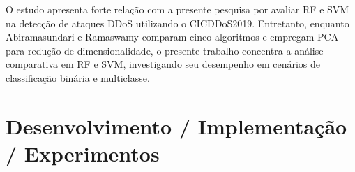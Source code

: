 \documentclass[
    12pt,                %
    openright,           %
    oneside,             %
    a4paper,             %
    english,             %
    brazil               %
]{abntex2}
\makeatletter
\renewcommand{\ABNTEXfontereduzida}{\fontsize{10}{12}\selectfont}
\renewcommand{\legend}[1]{%
  \M@gettitle{#1}%
  \memlegendinfo{#1}%
  \par
  \begingroup
    \@parboxrestore
    \if@minipage
      \@setminipage
    \fi
    \ABNTEXfontereduzida
    \captiondelim{\mbox{}}%
    \@makecaption{}{\ignorespaces #1}\par
  \endgroup}
\makeatother
\begin{document}
O estudo apresenta forte relação com a presente pesquisa por avaliar RF e SVM na detecção de ataques DDoS utilizando o CICDDoS2019. Entretanto, enquanto Abiramasundari e Ramaswamy \cite{abiramasundari2025} comparam cinco algoritmos e empregam PCA para redução de dimensionalidade, o presente trabalho concentra a análise comparativa em RF e SVM, investigando seu desempenho em cenários de classificação binária e multiclasse.

\chapter{Desenvolvimento / Implementação / Experimentos}
\label{cap:desenvolvimento}



\end{document}
